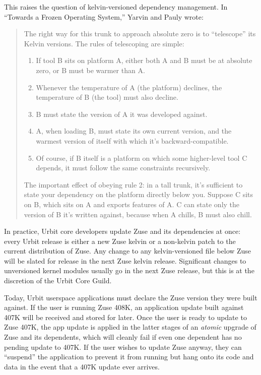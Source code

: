 \documentclass[twoside]{article}
\begin{document}
This raises the question of kelvin-versioned dependency management. In
``Towards a Frozen Operating System,'' Yarvin and Pauly wrote:

\begin{quote}
The right way for this trunk to approach absolute zero is
to ``telescope'' its Kelvin versions. The rules of telescoping are
simple:

\begin{enumerate}[noitemsep,topsep=2pt]
\item
  If tool B sits on platform A, either both A and B must be at absolute
  zero, or B must be warmer than A.
\item
  Whenever the temperature of A (the platform) declines, the
  temperature of B (the tool) must also decline.
\item
  B must state the version of A it was developed against.
\item
  A, when loading B, must state its own current version, and the
  warmest version of itself with which it's backward-compatible.
\item
  Of course, if B itself is a platform on which some higher-level tool
  C depends, it must follow the same constraints recursively.
\end{enumerate}

The important effect of obeying rule 2: in a tall trunk,
it's sufficient to state your dependency on the platform directly below
you. Suppose C sits on B, which sits on A and exports features of A. C
can state only the version of B it's written against, because when A
chills, B must also chill.
\end{quote}

In practice, Urbit core developers update Zuse and its dependencies at
once: every Urbit release is either a new Zuse kelvin or a non-kelvin patch to
the current distribution of Zuse. Any change to any kelvin-versioned
file below Zuse will be slated for release in the next Zuse kelvin release.
Significant changes to unversioned kernel modules usually go in the next
Zuse release, but this is at the discretion of the Urbit Core Guild.

Today, Urbit userspace applications must declare the Zuse version they
were built against. If the user is running Zuse 408K, an application
update built against 407K will be received and stored for later. Once
the user is ready to update to Zuse 407K, the app update is applied in
the latter stages of an \emph{atomic} upgrade of Zuse and its
dependents, which will cleanly fail if even one dependent has no pending
update to 407K. If the user wishes to update Zuse anyway, they can
``suspend'' the application to prevent it from running but hang onto its
code and data in the event that a 407K update ever arrives.
\end{document}
